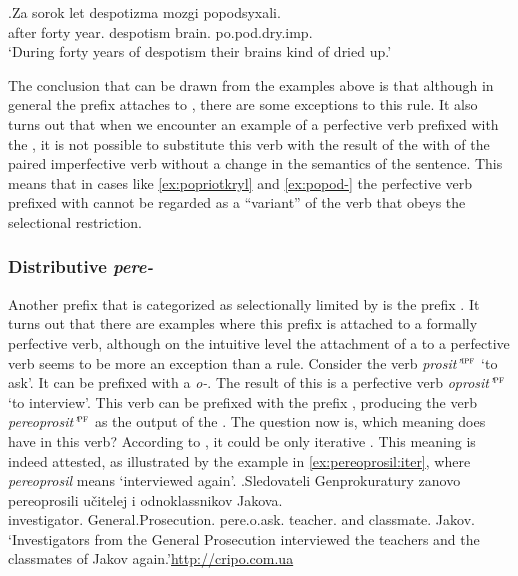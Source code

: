 \exg.\label{ex:popod-imp}Za sorok let despotizma mozgi popodsyxali.\\
after forty year. despotism brain. po.pod.dry.imp.\\
\trans `During forty years of despotism their brains kind of dried up.'

The conclusion that can be drawn from the examples above is that although in general the  prefix  attaches to , there are some exceptions to this rule. It also turns out that when we encounter an example of a perfective verb prefixed with the  , it is not possible to substitute this verb with the result of the  with  of the paired imperfective verb without a change in the semantics of the sentence. This means that in cases like \ref{ex:popriotkryl} and \ref{ex:popod-} the perfective verb prefixed with  cannot be regarded as a ``variant'' of the verb that obeys the selectional restriction.
 
\subsubsection{Distributive \textit{pere-}}
Another prefix that is categorized as selectionally limited by \citet{Tatevosov:09} is the  prefix . It turns out that there are examples where this prefix is attached to a formally perfective verb, although on the intuitive level the attachment of a   to a perfective verb seems to be more an exception than a rule. Consider the verb \textit{prosit'}$^{\textsc{ipf}}$ `to ask'. It can be prefixed with a  \textit{o-}. The result of this  is a perfective verb \textit{oprosit'}$^{\textsc{pf}}$ `to interview'. This verb can be prefixed with the prefix , producing the verb \textit{pereoprosit'}$^{\textsc{pf}}$ as the output of the . The question now is, which meaning does  have in this verb? According to \citet{Tatevosov:09}, it could be only iterative . This meaning is indeed attested, as illustrated by the example in \ref{ex:pereoprosil:iter}, where \textit{pereoprosil} means `interviewed again'.
\exg.\label{ex:pereoprosil:iter}Sledovateli Genprokuratury zanovo pereoprosili u\v{c}itelej i odnoklassnikov Jakova.\\
investigator. General.Prosecution.  pere.o.ask. teacher. and classmate. Jakov.\\
\trans `Investigators from the General Prosecution interviewed the teachers and the classmates of Jakov again.'\hbox{}\hfill\hbox{\url{http://cripo.com.ua}}

